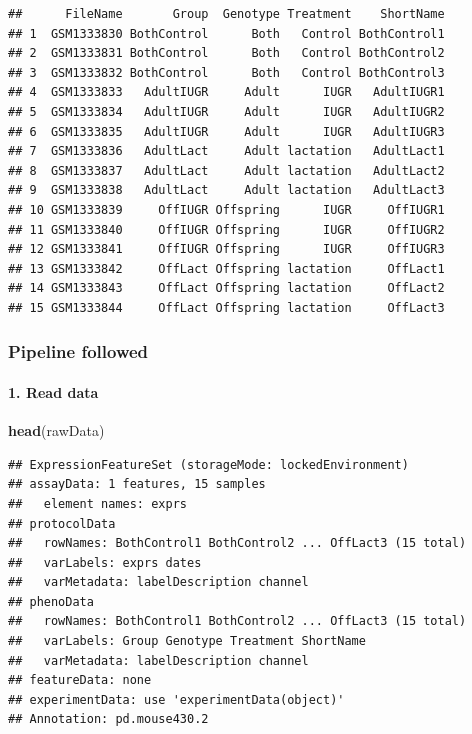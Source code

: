 \documentclass[]{article}
\newenvironment{Shaded}{\begin{snugshade}}{\end{snugshade}}
\newcommand{\KeywordTok}[1]{\textcolor[rgb]{0.13,0.29,0.53}{\textbf{#1}}}
\newcommand{\NormalTok}[1]{#1}
\let\oldparagraph\paragraph
\renewcommand{\paragraph}[1]{\oldparagraph{#1}\mbox{}}
\begin{document}
\begin{verbatim}
##      FileName       Group  Genotype Treatment    ShortName
## 1  GSM1333830 BothControl      Both   Control BothControl1
## 2  GSM1333831 BothControl      Both   Control BothControl2
## 3  GSM1333832 BothControl      Both   Control BothControl3
## 4  GSM1333833   AdultIUGR     Adult      IUGR   AdultIUGR1
## 5  GSM1333834   AdultIUGR     Adult      IUGR   AdultIUGR2
## 6  GSM1333835   AdultIUGR     Adult      IUGR   AdultIUGR3
## 7  GSM1333836   AdultLact     Adult lactation   AdultLact1
## 8  GSM1333837   AdultLact     Adult lactation   AdultLact2
## 9  GSM1333838   AdultLact     Adult lactation   AdultLact3
## 10 GSM1333839     OffIUGR Offspring      IUGR     OffIUGR1
## 11 GSM1333840     OffIUGR Offspring      IUGR     OffIUGR2
## 12 GSM1333841     OffIUGR Offspring      IUGR     OffIUGR3
## 13 GSM1333842     OffLact Offspring lactation     OffLact1
## 14 GSM1333843     OffLact Offspring lactation     OffLact2
## 15 GSM1333844     OffLact Offspring lactation     OffLact3
\end{verbatim}

\subsubsection{Pipeline followed}\label{pipeline-followed}

\paragraph{1. Read data}\label{read-data}

\begin{Shaded}
\begin{Highlighting}[]
\KeywordTok{head}\NormalTok{(rawData)}
\end{Highlighting}
\end{Shaded}

\begin{verbatim}
## ExpressionFeatureSet (storageMode: lockedEnvironment)
## assayData: 1 features, 15 samples 
##   element names: exprs 
## protocolData
##   rowNames: BothControl1 BothControl2 ... OffLact3 (15 total)
##   varLabels: exprs dates
##   varMetadata: labelDescription channel
## phenoData
##   rowNames: BothControl1 BothControl2 ... OffLact3 (15 total)
##   varLabels: Group Genotype Treatment ShortName
##   varMetadata: labelDescription channel
## featureData: none
## experimentData: use 'experimentData(object)'
## Annotation: pd.mouse430.2
\end{verbatim}
\end{document}
